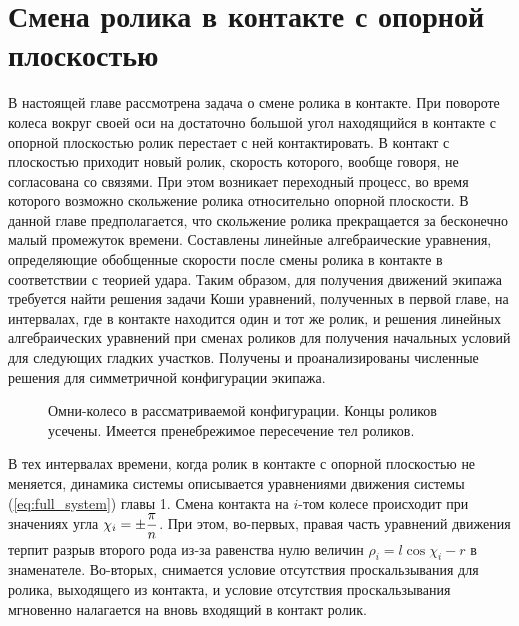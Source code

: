 \chapter{Смена ролика в контакте с опорной плоскостью}


В настоящей главе рассмотрена задача о смене ролика в контакте. При повороте колеса вокруг своей оси на достаточно большой угол находящийся в контакте с опорной плоскостью ролик перестает с ней контактировать. В контакт с плоскостью приходит новый ролик, скорость которого, вообще говоря, не согласована со связями. При этом возникает переходный процесс, во время которого возможно скольжение ролика относительно опорной плоскости. В данной главе предполагается, что скольжение ролика прекращается за бесконечно малый промежуток времени. Составлены линейные алгебраические уравнения, определяющие обобщенные скорости после смены ролика в контакте в соответствии с теорией удара. Таким образом, для получения движений экипажа требуется найти решения задачи Коши уравнений, полученных в первой главе, на интервалах, где в контакте находится один и тот же ролик, и решения линейных алгебраических уравнений при сменах роликов для получения начальных условий для следующих гладких участков. Получены и проанализированы численные решения для симметричной конфигурации экипажа.

\begin{figure}
    \minipage{\textwidth}
        \centering
        \caption{Омни-колесо в рассматриваемой конфигурации. Концы роликов усечены. Имеется пренебрежимое пересечение тел роликов.}
        \label{fig:overlap}
    \endminipage
\end{figure}

В тех интервалах времени, когда ролик в контакте с опорной плоскостью не меняется, динамика системы описывается уравнениями движения системы (\ref{eq:full_system}) главы 1. Смена контакта на $i$-том колесе происходит при значениях угла $\chi_i = \pm\displaystyle\frac{\displaystyle \pi}{\displaystyle n}$. При этом, во-первых, правая часть уравнений движения терпит разрыв второго рода из-за равенства нулю величин $\rho_i = l\cos\chi_i-r$ в знаменателе. Во-вторых, снимается условие отсутствия проскальзывания для ролика, выходящего из контакта, и условие отсутствия проскальзывания мгновенно налагается на вновь входящий в контакт ролик.

